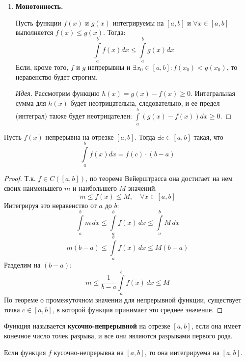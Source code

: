 \documentclass[12pt]{article}
\newcommand{\dint}{\displaystyle\int}
\begin{document}
\begin{enumerate}
		\item \textbf{Монотонность.}
		
		Пусть функции $f(x)$ и $g(x)$ интегрируемы на $[a, b]$ и $\forall x \in [a, b]$ выполняется $f(x) \leqslant g(x)$. Тогда:
		$$ \dint\limits_a^b f(x) dx \leqslant \dint\limits_a^b g(x) dx $$
		Если, кроме того, $f$ и $g$ непрерывны и $\exists x_0 \in [a, b]: f(x_0) < g(x_0)$, то неравенство будет строгим.
		
		\begin{proof}[Идея]
			Рассмотрим функцию $h(x) = g(x) - f(x) \geqslant 0$. Интегральная сумма для $h(x)$ будет неотрицательна, следовательно, и ее предел (интеграл) также будет неотрицателен: $\dint\limits_a^b (g(x) - f(x)) dx \geqslant 0$.
		\end{proof}
		
	\end{enumerate}
	
	\begin{theorem}
		Пусть $f(x)$ непрерывна на отрезке $[a, b]$. Тогда $\exists c \in [a, b]$ такая, что
		$$ \dint\limits_a^b f(x) dx = f(c) \cdot (b - a) $$
	\end{theorem}
	\begin{proof}
		Т.к. $f \in C([a, b])$, по теореме Вейерштрасса она достигает на нем своих наименьшего $m$ и наибольшего $M$ значений.
		$$ m \leqslant f(x) \leqslant M, \quad \forall x \in [a, b] $$
		Интегрируя это неравенство от $a$ до $b$:
		$$ \dint\limits_a^b m \,dx \leqslant \dint\limits_a^b f(x) \,dx \leqslant \dint\limits_a^b M \,dx $$
		$$ m(b - a) \leqslant \dint\limits_a^b f(x) \,dx \leqslant M(b - a) $$
		Разделим на $(b - a)$:
		$$ m \leqslant \frac{1}{b - a}\dint\limits_a^b f(x) \,dx \leqslant M $$
		По теореме о промежуточном значении для непрерывной функции, существует точка $c \in [a, b]$, в которой функция принимает это среднее значение.
	\end{proof}
	
	\begin{definition}
		Функция называется \textbf{кусочно-непрерывной} на отрезке $[a, b]$, если она имеет конечное число точек разрыва, и все они являются разрывами первого рода.
	\end{definition}
	
	\begin{theorem}
		Если функция $f$ кусочно-непрерывна на $[a, b]$, то она интегрируема на $[a, b]$.
	\end{theorem}
	
\end{document}

